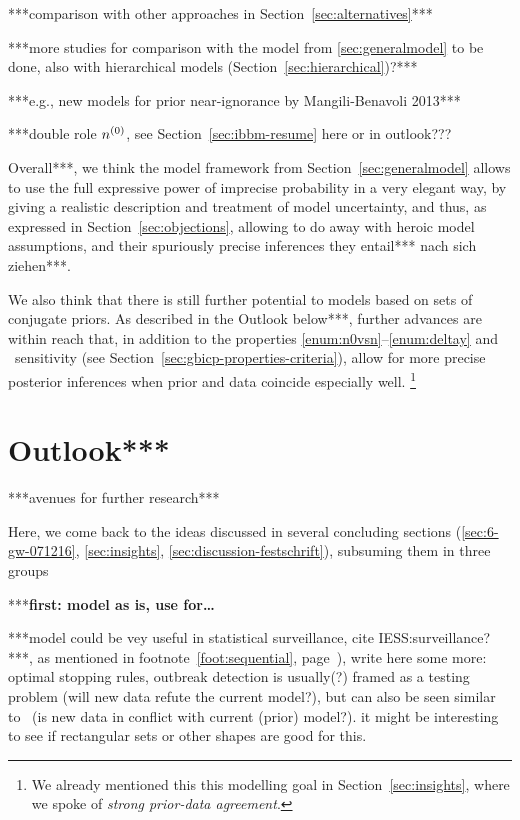 ***comparison with other approaches in Section~\ref{sec:alternatives}***

***more studies for comparison with the model from \ref{sec:generalmodel} to be done,
also with hierarchical models (Section~\ref{sec:hierarchical})?***

***e.g., new models for prior near-ignorance by Mangili-Benavoli 2013***


***double role $n^{(0)}$, see Section~\ref{sec:ibbm-resume} here or in outlook???



Overall***, we think the model framework from Section~\ref{sec:generalmodel}
allows to use the full expressive power of imprecise probability %
in a very elegant way, by giving a realistic description and treatment
of model uncertainty, and thus, as expressed in Section~\ref{sec:objections},
allowing to do away with heroic model assumptions, and their spuriously precise inferences they entail*** nach sich ziehen***.

We also think that there is still further potential to models based on sets of conjugate priors.
As described in the Outlook below***,
further advances are within reach 
that, in addition to the properties \ref{enum:n0vsn}--\ref{enum:deltay} and \pdc\ sensitivity
(see Section~\ref{sec:gbicp-properties-criteria}),
allow for more precise posterior inferences when prior and data coincide especially well.%
\footnote{We already mentioned this this modelling goal in Section~\ref{sec:insights},
where we spoke of \emph{strong prior-data agreement}.}



\section{Outlook***}
\label{sec:concluding-outlook}

***avenues for further research***

Here, we come back to the ideas discussed in several concluding sections
(\ref{sec:6-gw-071216}, \ref{sec:insights}, \ref{sec:discussion-festschrift}),
subsuming them in three groups

***\textbf{first: model as is, use for\dots }

***model could be vey useful in statistical surveillance, cite IESS:surveillance?***,
as mentioned in footnote~\ref{foot:sequential}, page~\pageref{foot:sequential}),
write here some more: optimal stopping rules, outbreak detection is usually(?)
framed as a testing problem (will new data refute the current model?),
but can also be seen similar to \pdc\ (is new data in conflict with current (prior) model?).
it might be interesting to see if rectangular sets or other shapes are good for this.  

